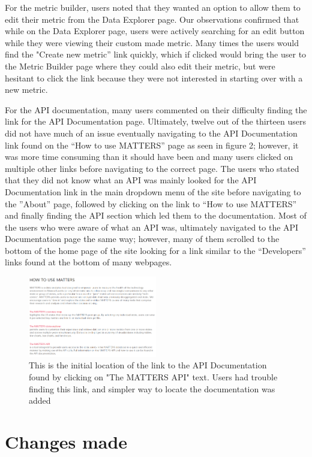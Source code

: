 	For the metric builder, users noted that they wanted an option to allow them to edit their metric from the Data Explorer page. Our observations confirmed that while on the Data Explorer page, users were actively searching for an edit button while they were viewing their custom made metric. Many times the users would find the "Create new metric” link quickly, which if clicked would bring the user to the Metric Builder page where they could also edit their metric, but were hesitant to click the link because they were not interested in starting over with a new metric.
	
	For the API documentation, many users commented on their difficulty finding the link for the API Documentation page. Ultimately, twelve out of the thirteen users did not have much of an issue eventually navigating to the API Documentation link found on the “How to use MATTERS” page as seen in figure 2; however, it was more time consuming than it should have been and many users clicked on multiple other links before navigating to the correct page. The users who stated that they did not know what an API was mainly looked for the API Documentation link in the main dropdown menu of the site before navigating to the ”About” page, followed by clicking on the link to “How to use MATTERS” and finally finding the API section which led them to the documentation. Most of the users who were aware of what an API was, ultimately navigated to the API Documentation page the same way; however, many of them scrolled to the bottom of the home page of the site looking for a link similar to the “Developers” links found at the bottom of many webpages.
	
		\begin{figure}[!ht]
			\centering
			\includegraphics[width=0.5\textwidth]{images/howto.png}
		\caption{This is the initial location of the link to the API Documentation found by clicking on "The MATTERS API" text. Users had trouble finding this link, and simpler way to locate the documentation was added}
		\end{figure}
	
\section{Changes made}

